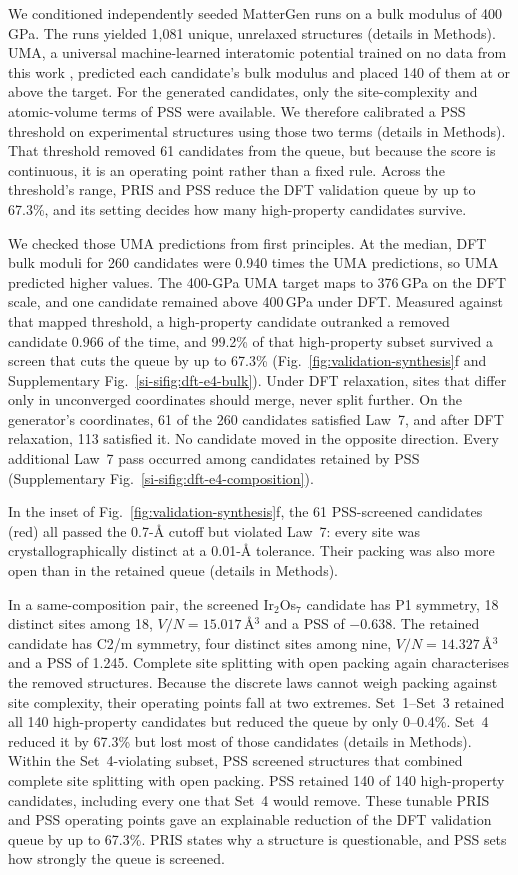 We conditioned independently seeded MatterGen runs on a bulk modulus of
400\,GPa. The runs yielded 1{,}081 unique, unrelaxed structures (details in Methods). UMA, a universal
machine-learned interatomic potential trained on no data from this work
\cite{wood2025uma}, predicted each candidate's bulk modulus and placed 140 of them at or
above the target. For the generated candidates, only the site-complexity and
atomic-volume terms of PSS were available. We therefore calibrated a PSS threshold on
experimental structures using those two terms (details in Methods). That threshold removed 61 candidates from the queue, but because the score is continuous, it is an operating point rather than a fixed rule. Across the threshold's range,
PRIS and PSS reduce the DFT validation queue by up to 67.3\%, and its setting
decides how many high-property candidates survive.

We checked those UMA predictions from first principles. At the median, DFT
bulk moduli for 260 candidates were 0.940 times the UMA predictions, so UMA predicted
higher values. The 400-GPa UMA target maps to 376\,GPa on the DFT
scale, and one candidate remained above 400\,GPa under DFT. Measured against that mapped
threshold, a high-property candidate outranked a removed
candidate 0.966 of the time, and 99.2\% of that high-property subset survived a screen that
cuts the queue by up to 67.3\%
(Fig.~\ref{fig:validation-synthesis}f and Supplementary
Fig.~\ref{si-sifig:dft-e4-bulk}).
Under DFT relaxation, sites that differ only in unconverged coordinates should merge, never
split further. On the generator's coordinates, 61
of the 260 candidates satisfied Law~7, and after DFT relaxation, 113 satisfied it. No candidate
moved in the opposite direction. Every additional Law~7 pass occurred among candidates
retained by PSS (Supplementary Fig.~\ref{si-sifig:dft-e4-composition}).

In the inset of Fig.~\ref{fig:validation-synthesis}f, the 61 PSS-screened candidates (red) all passed the
0.7-\AA{} cutoff but violated Law~7: every site was
crystallographically distinct at a 0.01-\AA{} tolerance. Their packing was also more open
than in the retained queue (details in Methods).

In a same-composition pair, the screened
Ir$_2$Os$_7$ candidate has P1 symmetry, 18 distinct sites among 18,
\(V/N=15.017\)\,\AA$^3$ and a PSS of $-0.638$. The retained candidate has C2/m symmetry,
four distinct sites among nine, \(V/N=14.327\)\,\AA$^3$ and a PSS of 1.245. Complete site
splitting with open packing again characterises the removed structures.
Because the discrete laws cannot weigh packing against site complexity, their operating
points fall at two extremes. Set~1--Set~3 retained all 140 high-property candidates but reduced
the queue by only 0--0.4\%. Set~4 reduced it by 67.3\% but lost most of those candidates
(details in Methods). Within the Set~4-violating subset, PSS screened structures that combined complete
site splitting with open packing. PSS retained 140 of 140 high-property candidates, including every one that Set~4 would
remove. These tunable PRIS and PSS operating points gave an
explainable reduction of the DFT validation queue by up to 67.3\%. PRIS
states why a structure is questionable, and PSS sets how strongly the queue is screened.

